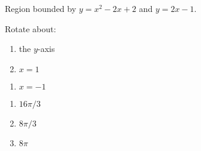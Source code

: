 {Region bounded by $y=x^2-2x+2$ and $y=2x-1$.

Rotate about:

\noindent%
\begin{minipage}[t]{.5\linewidth}
\begin{enumerate}
\item		the $y$-axis
\item		$x=1$
\end{enumerate}
\end{minipage}
\begin{minipage}[t]{.5\linewidth}
\begin{enumerate}\addtocounter{enumii}{2}
\item		$x=-1$
\end{enumerate}
\end{minipage}
}
{\begin{enumerate}
\item $16\pi/3$
\item $8\pi/3$
\item $8\pi$
\end{enumerate}
}
